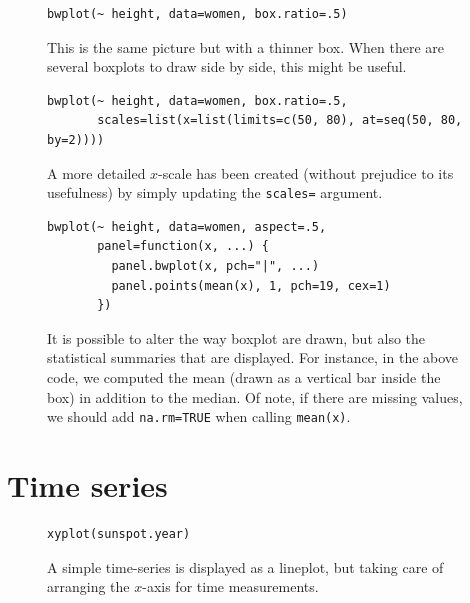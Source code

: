\documentclass[a4paper,twoside]{book}
\newcounter{fig}
\newcommand{\img}[1]{\texttt{[image: \#1]}\stepcounter{fig}}
\renewcommand{\texttt}[1]{\lstinline{#1}}
\begin{document}
\begin{figure}[H]
\begin{lstlisting}
bwplot(~ height, data=women, box.ratio=.5)
\end{lstlisting}
  \fcapside[\FBwidth] {\img{figs_lattice-crop}} {\caption*{This is the
      same picture but with a thinner box. When there are several
      boxplots to draw side by side, this might be useful.}}
\end{figure}

\begin{figure}[H]
\begin{lstlisting}
bwplot(~ height, data=women, box.ratio=.5,
       scales=list(x=list(limits=c(50, 80), at=seq(50, 80, by=2))))
\end{lstlisting}
  \fcapside[\FBwidth] {\img{figs_lattice-crop}} {\caption*{A more
      detailed $x$-scale has been created (without prejudice to its
      usefulness) by simply updating the \texttt{scales=} argument.}}
\end{figure}

\begin{figure}[H]
\begin{lstlisting}
bwplot(~ height, data=women, aspect=.5, 
       panel=function(x, ...) {
         panel.bwplot(x, pch="|", ...)
         panel.points(mean(x), 1, pch=19, cex=1)
       })
\end{lstlisting}
  \fcapside[\FBwidth] {\img{figs_lattice-crop}} {\caption*{It is
      possible to alter the way boxplot are drawn, but also the
      statistical summaries that are displayed. For instance, in the
      above code, we computed the mean (drawn as a vertical bar inside
      the box) in addition to the median. Of note, if there are
      missing values, we should add \texttt{na.rm=TRUE} when calling
      \texttt{mean(x)}.}}
\end{figure}

\section{Time series}
\lipsum[1]

\begin{figure}[H]
\begin{lstlisting}
xyplot(sunspot.year)
\end{lstlisting}
  \fcapside[\FBwidth] {\img{figs_lattice-crop}}
  {\caption*{ A simple time-series is displayed
      as a lineplot, but taking care of arranging the $x$-axis for
      time measurements.}}
\end{figure}
\end{document}
